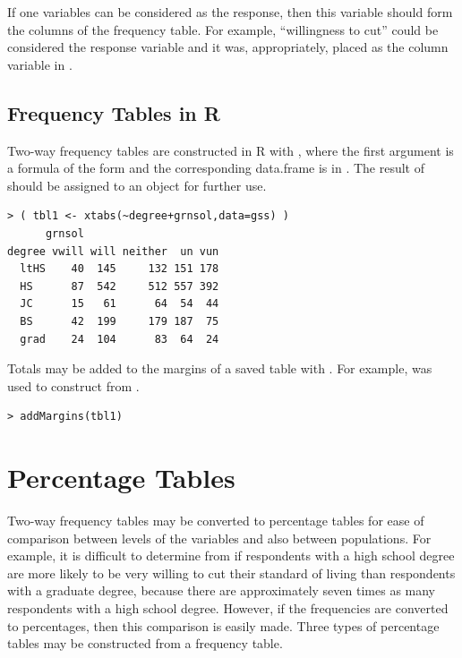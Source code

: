 \documentclass[10pt,openany]{book}\usepackage[]{graphicx}\usepackage[]{color}
\makeatletter
\newenvironment{kframe}{%
 \def\at@end@of@kframe{}%
 \ifinner\ifhmode%
  \def\at@end@of@kframe{\end{minipage}}%
  \begin{minipage}{\columnwidth}%
 \fi\fi%
 \def\FrameCommand##1{\hskip\@totalleftmargin \hskip-\fboxsep
 \colorbox{shadecolor}{##1}\hskip-\fboxsep
     \hskip-\linewidth \hskip-\@totalleftmargin \hskip\columnwidth}%
 \MakeFramed {\advance\hsize-\width
   \@totalleftmargin\z@ \linewidth\hsize
   \@setminipage}}%
 {\par\unskip\endMakeFramed%
 \at@end@of@kframe}
\newenvironment{knitrout}{}{} %
\makeatother
\begin{document}
If one variables can be considered as the response, then this variable should form the columns of the frequency table. For example, ``willingness to cut'' could be considered the response variable and it was, appropriately, placed as the column variable in .

\vspace{-6pt}
\subsection*{Frequency Tables in R}
\vspace{-6pt}
Two-way frequency tables are constructed in R with , where the first argument is a formula of the form  and the corresponding data.frame is in . The result of  should be assigned to an object for further use.
\vspace{-4pt}
\begin{knitrout}
\color{fgcolor}\begin{kframe}
\begin{verbatim}
> ( tbl1 <- xtabs(~degree+grnsol,data=gss) )
      grnsol
degree vwill will neither  un vun
  ltHS    40  145     132 151 178
  HS      87  542     512 557 392
  JC      15   61      64  54  44
  BS      42  199     179 187  75
  grad    24  104      83  64  24
\end{verbatim}
\end{kframe}
\end{knitrout}
\vspace{-4pt}
Totals may be added to the margins of a saved table with . For example,  was used to construct  from .
\vspace{-4pt}
\begin{knitrout}
\color{fgcolor}\begin{kframe}
\begin{verbatim}
> addMargins(tbl1)
\end{verbatim}
\end{kframe}
\end{knitrout}


\section{Percentage Tables}
Two-way frequency tables may be converted to percentage tables for ease of comparison between levels of the variables and also between populations. For example, it is difficult to determine from  if respondents with a high school degree are more likely to be very willing to cut their standard of living than respondents with a graduate degree, because there are approximately seven times as many respondents with a high school degree. However, if the frequencies are converted to percentages, then this comparison is easily made. Three types of percentage tables may be constructed from a frequency table.
\end{document}
